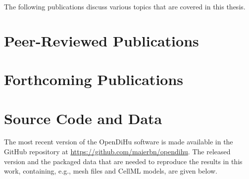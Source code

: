 



\nocite{Bradley:2018:EDB}
\nocite{Maier2019}
\nocite{Maier2021}
\nocite{summerschool2019}
\nocite{hlrs2020}
\nocite{MaierSubmitted2}
\nocite{MaierSubmitted}
\nocite{hlrs2021}
\nocite{maier_benjamin_2021_4705945}
\nocite{opendihu}


  
  
The following publications discuss various topics that are covered in this thesis.

\section*{Peer-Reviewed Publications}
\printbibliography[category=own,heading=none,title=]

\section*{Forthcoming Publications}
\printbibliography[category=own_forthcoming,heading=none,title=]

\section*{Source Code and Data}
The most recent version of the OpenDiHu software is made available in the GitHub repository at \url{https://github.com/maierbn/opendihu}. 
The released version and the packaged data that are needed to reproduce the results in this work, containing, e.g., mesh files and CellML models, are given below.

\printbibliography[category=own_other,heading=none,title=]



\cleardoublepage

